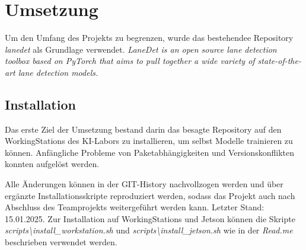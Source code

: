 \documentclass{article}
\begin{document}
    \section{Umsetzung}
        Um den Umfang des Projekts zu begrenzen, wurde das bestehendee Repository \textit{lanedet} als Grundlage verwendet.
        \textit{LaneDet is an open source lane detection toolbox based on PyTorch that aims to pull together a wide variety of state-of-the-art lane detection models.}

        \subsection{Installation}
            Das erste Ziel der Umsetzung bestand darin das besagte Repository auf den WorkingStations des KI-Labors zu installieren, um selbst Modelle trainieren zu können.
            Anfängliche Probleme von Paketabhängigkeiten und Versionskonflikten konnten aufgelöst werden. 

            Alle Änderungen können in der GIT-History nachvollzogen werden und über ergänzte Installationsskripte reproduziert werden, sodass das Projekt auch nach Abschluss des Teamprojekts weitergeführt werden kann. Letzter Stand: 15.01.2025. %
            Zur Installation auf WorkingStations und Jetson können die Skripte \textit{scripts\textbackslash install\_workstation.sh} und \textit{scripts\textbackslash install\_jetson.sh} wie in der \textit{Read.me} beschrieben verwendet werden.
\end{document}
